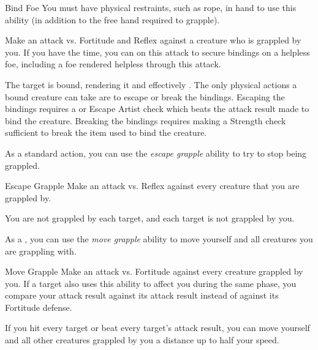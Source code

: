             \begin{freeability}{Bind Foe}
                You must have physical restraints, such as rope, in hand to use this ability (in addition to the free hand required to grapple).

                Make an attack vs. Fortitude and Reflex against a creature who is grappled by you.
                If you have the time, you can  on this attack to secure bindings on a helpless foe, including a foe rendered helpless through this attack.

                \hit The target is bound, rendering it  and effectively .
                The only physical actions a bound creature can take are to escape or break the bindings.
                Escaping the bindings requires a  or Escape Artist check which beats the attack result made to bind the creature.
                Breaking the bindings requires making a Strength check sufficient to break the item used to bind the creature.
            \end{freeability}

             As a standard action, you can use the \textit{escape grapple} ability to try to stop being grappled.

            \begin{freeability}{Escape Grapple}
                Make an attack vs. Reflex against every creature that you are grappled by.

                \hit You are not grappled by each target, and each target is not grappled by you.
            \end{freeability}

             As a , you can use the \textit{move grapple} ability to move yourself and all creatures you are grappling with.

            \begin{freeability}{Move Grapple}
                Make an attack vs. Fortitude against every creature grappled by you.
                If a target also uses this ability to affect you during the same phase, you compare your attack result against its attack result instead of against its Fortitude defense.

                If you hit every target or beat every target's attack result, you can move yourself and all other creatures grappled by you a distance up to half your speed.
            \end{freeability}

